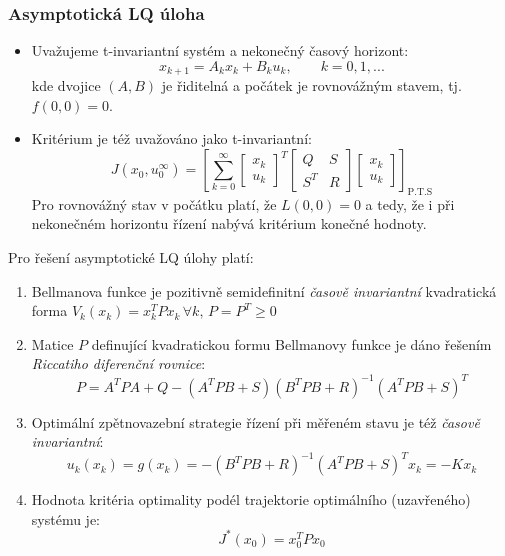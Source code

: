 \subsubsection*{Asymptotická LQ úloha}
\begin{itemize}
\item Uvažujeme t-invariantní systém a nekonečný časový horizont:
\begin{equation}
x_{k+1} = A_k x_k + B_k u_k, \qquad k=0,1,...
\end{equation}
kde dvojice $ (A, B) $ je řiditelná a počátek je rovnovážným stavem, tj. $ f(0, 0) = 0 $.
\item Kritérium je též uvažováno jako t-invariantní:
\begin{equation}
J(x_0, u_0^{\infty}) = \left[ \displaystyle{\sum_{k=0}^{\infty}} \begin{bmatrix} x_k \\ u_k \end{bmatrix}^T \begin{bmatrix} Q & S \\ S^T & R \end{bmatrix} \begin{bmatrix} x_k \\ u_k \end{bmatrix} \right]_{\mathrm{P.T.S}}
\end{equation}
Pro rovnovážný stav v počátku platí, že $ L(0, 0) = 0 $ a tedy, že i při nekonečném horizontu řízení nabývá kritérium konečné hodnoty.
\end{itemize}
Pro řešení asymptotické LQ úlohy platí:
\begin{enumerate}
\item Bellmanova funkce je pozitivně semidefinitní \textit{časově invariantní} kvadratická forma $ V_k(x_k) = x_k^T P x_k \, \forall k, \, P = P^T \geq 0 $
\item Matice $ P $ definující kvadratickou formu Bellmanovy funkce je dáno řešením \textit{Riccatiho diferenční rovnice}:
\begin{equation}
P = A^T P A + Q - (A^T P B + S)(B^T P B + R)^{-1}(A^T P B + S)^T
\end{equation}
\item Optimální zpětnovazební strategie řízení při měřeném stavu je též \textit{časově invariantní}:
\begin{equation*}
u_k(x_k) = g(x_k) = -(B^T P B + R)^{-1}(A^T P B + S)^T x_k = - K x_k
\end{equation*}
\item Hodnota kritéria optimality podél trajektorie optimálního (uzavřeného) systému je:
\begin{equation*}
J^*(x_0) = x_0^T P x_0
\end{equation*}
\end{enumerate}
